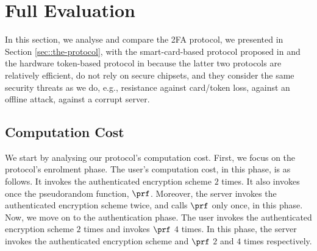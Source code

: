 

\section{Full Evaluation}\label{app:long-eval}

In this section, we analyse and compare the 2FA protocol, we presented in Section \ref{sec::the-protocol}, with the smart-card-based protocol proposed in  \cite{WangW18} and the hardware token-based protocol in \cite{JareckiJKSS21} because the latter two protocols are relatively efficient, do not rely on secure chipsets, and they consider the same security threats as we do, e.g., resistance against card/token loss, against an offline attack, against a  corrupt server. %







%



\subsection{Computation Cost}

We start by analysing our protocol's computation cost. First, we focus on the protocol's enrolment phase. The user's computation cost, in this phase, is as follows. It invokes the authenticated encryption scheme $2$ times. It also invokes once the pseudorandom function, $\prf$.
%
% 
  Moreover, the server invokes the authenticated encryption scheme twice, and calls $\prf$ only once, in this phase. 
%  
%
Now, we move on to the authentication phase. The user invokes the authenticated encryption scheme $2$ times and invokes $\prf$ $4$ times. 
%
%
 In this phase, the server invokes the authenticated encryption scheme and $\prf$ $2$ and $4$ times respectively. %

